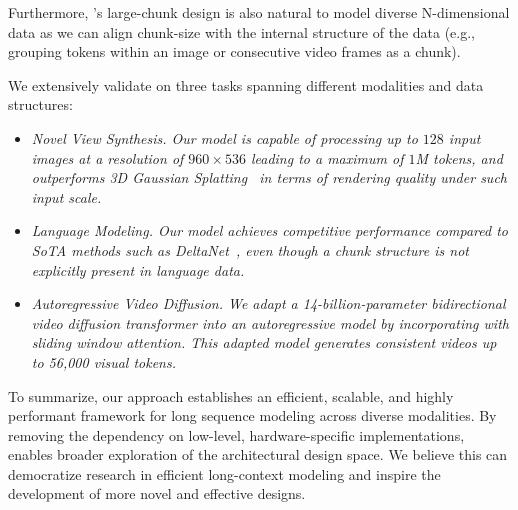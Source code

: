 Furthermore, \methodname's large-chunk design is also natural to model diverse N-dimensional data as we can align chunk-size with the internal structure of the data (e.g., grouping tokens within an image or consecutive video frames as a chunk).






We extensively  validate \methodname{} on three tasks spanning different modalities and data structures: 
\begin{itemize}
\item \em{Novel View Synthesis}.
Our model is capable of processing up to $128$ input images 
at a resolution of $960\!\times\!536$ leading to a maximum of $1$M tokens, and  outperforms 3D Gaussian Splatting~\cite{kerbl20233d} in terms of rendering quality under such input scale.
\item \em{Language Modeling}.
Our model achieves competitive performance compared to SoTA methods such as DeltaNet~\cite{yang2024parallelizing}, even though a chunk structure is not explicitly present in language data.
\item \em{Autoregressive Video Diffusion}. 
We adapt a 14-billion-parameter bidirectional video diffusion transformer into an autoregressive model by incorporating \methodname{} with sliding window attention. This adapted model generates consistent videos up to 56,000 visual tokens.
\end{itemize}


To summarize, our approach establishes an efficient, scalable, and highly performant framework for long 
sequence modeling across diverse modalities. 
By removing the dependency on low-level, hardware-specific implementations, \methodname{} enables broader exploration of the architectural design space. We believe this can democratize research in efficient long-context modeling and inspire the development of more novel and effective designs.  


